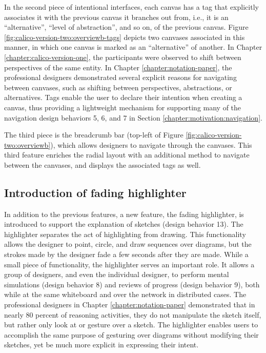 In the second piece of intentional interfaces, each canvas has a tag that explicitly associates it with the previous canvas it branches out from, i.e., it is an ``alternative'', ``level of abstraction'', and so on, of the previous canvas. Figure \ref{fig:calico-version-two:overviewb-tags} depicts two canvases associated in this manner, in which one canvas is marked as an ``alternative'' of another. In Chapter \ref{chapter:calico-version-one}, the participants were observed to shift between perspectives of the same entity. In Chapter \ref{chapter:notation-paper}, the professional designers demonstrated several explicit reasons for navigating between canvases, such as shifting between perspectives, abstractions, or alternatives. Tags enable the user to declare their intention when creating a canvas, thus providing a lightweight mechanism for supporting many of the navigation design behaviors 5, 6, and 7 in Section \ref{chapter:motivation:navigation}. 

The third piece is the breadcrumb bar (top-left of Figure \ref{fig:calico-version-two:overviewb}), which allows designers to navigate through the canvases. This third feature enriches the radial layout with an additional method to navigate between the canvases, and displays the associated tags as well.

\subsection{Introduction of fading highlighter}

In addition to the previous features, a new feature, the fading highlighter, is introduced to support the explanation of sketches (design behavior 13). The highlighter separates the act of highlighting from drawing. This functionality allows the designer to point, circle, and draw sequences over diagrams, but the strokes made by the designer fade a few seconds after they are made. While a small piece of functionality, the highlighter serves an important role. It allows a group of designers, and even the individual designer, to perform mental simulations (design behavior 8) and reviews of progress (design behavior 9), both while at the same whiteboard and over the network in distributed cases. The professional designers in Chapter \ref{chapter:notation-paper} demonstrated that in nearly 80 percent of reasoning activities, they do not manipulate the sketch itself, but rather only look at or gesture over a sketch. The highlighter enables users to accomplish the same purpose of gesturing over diagrams without modifying their sketches, yet be much more explicit in expressing their intent.

